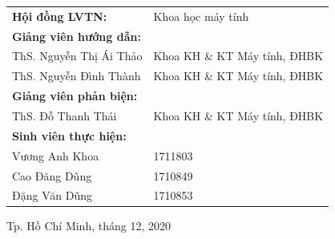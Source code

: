 \begin{titlepage}
    \begin{center}
        \def\arraystretch{1.5}
        \begin{tabular}{ll}
            \textbf{Hội đồng LVTN:} & Khoa học máy tính \\
            \textbf{Giảng viên hướng dẫn:} & \\
            \hspace{0.5cm} ThS. Nguyễn Thị Ái Thảo & Khoa KH \& KT Máy tính, ĐHBK \\
            \hspace{0.5cm} ThS. Nguyễn Đình Thành & Khoa KH \& KT Máy tính, ĐHBK \\
            \textbf{Giảng viên phản biện:} & \\
            \hspace{0.5cm} ThS. Đỗ Thanh Thái & Khoa KH \& KT Máy tính, ĐHBK \\
            \textbf{Sinh viên thực hiện:} & \\
            \hspace{0.5cm} Vương Anh Khoa & 1711803 \\
            \hspace{0.5cm} Cao Đăng Dũng & 1710849 \\
            \hspace{0.5cm} Đặng Văn Dũng & 1710853 \\
        \end{tabular}
        \vspace{1cm}
    \end{center}
    
    \begin{center}
        Tp. Hồ Chí Minh, tháng 12, 2020
    \end{center}
    
\end{titlepage}